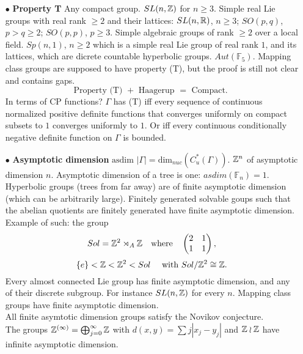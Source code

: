 \begin{itemize}
\item[$\bullet$] \textbf{Property T} Any compact group. $SL(n,\mathbb Z)$ for $n\geq 3$. Simple real Lie groups with real rank $\geq 2$ and their lattices: $SL(n,\mathbb R)$, $n\geq 3$; $SO(p,q)$, $p>q\geq 2$; $SO(p,p)$, $p\geq 3$. Simple algebraic groups of rank $\geq 2$ over a local field. $Sp(n,1)$, $n\geq 2$ which is a simple real Lie group of real rank $1$, and its lattices, which are dicrete countable hyperbolic groups. $Aut (\mathbb F_5)$. Mapping class groups are supposed to have property (T), but the proof is still not clear and contains gaps. \\ 
\[\text{Property (T) } + \text{ Haagerup } = \text{ Compact. } \]
In terms of CP functions? $\Gamma$ has (T) iff every sequence of continuous normalized positive definite functions that converges uniformly on compact subsets to $1$ converges uniformly to $1$. Or iff every continuous conditionally negative definite function on $\Gamma$ is bounded.\\

\item[$\bullet$] \textbf{Asymptotic dimension} $\text{asdim }|\Gamma| = \text{dim}_{nuc}( C_u^*(\Gamma)) $. $\mathbb Z^n$ of asymptotic dimension $n$. Asymptotic dimension of a tree is one: $asdim(\mathbb F_n) = 1$. Hyperbolic groups (trees from far away) are of finite asymptotic dimension (which can be arbitrarily large). Finitely generated solvable goups such that the abelian quotients are finitely generated have finite asymptotic dimension. Example of such: the group 
\[Sol = \mathbb Z^2\rtimes_A \mathbb Z \quad \text{where}\quad \begin{pmatrix} 2 & 1 \\ 1 & 1 \end{pmatrix},\]
\[ \{e\} < \mathbb Z < \mathbb Z^2 < Sol \quad \text{ with } Sol/ \mathbb Z^2 \cong \mathbb Z.\]
Every almost connected Lie group has finite asymptotic dimension, and any of their discrete subgroup. For instance $SL(n,\mathbb Z)$ for every $n$. Mapping class groups have finite asymptotic dimension. \\

All finite asymtotic dimension groups satisfy the Novikov conjecture.\\

The groups $\mathbb Z^{(\infty)}=\bigoplus_{j=0}^\infty \mathbb Z$ with $d(x,y)=\sum j |x_j -y_j|$ and $\mathbb Z \wr \mathbb Z$ have infinite asymptotic dimension.\\


\end{itemize}
